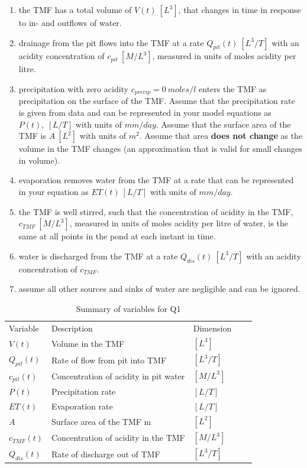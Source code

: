 \documentclass{article}
\begin{document}
\begin{enumerate}
\item  the TMF has a total volume of $V(t)~[L^3]$, that changes in time in response to in- and outflows of water.
\item drainage from the pit flows into the TMF at a rate $Q_{pit}(t)~[L^3/T]$ with an acidity concentration of $c_{pit}~[M/L^3]$, measured in units of moles acidity per litre.
\item precipitation with zero acidity $c_{precip} = 0~ moles/l$ enters the TMF as precipitation on the surface of the TMF. Assume that the precipitation rate is given from data and can be represented in your model equations as $P(t),~[L/T]$ with units of $mm/day$. Assume that the surface area of the TMF is $A~[L^2]$ with units of $m^2$. Assume that area \textbf{does not change} as the volume in the TMF changes (an approximation that is valid for small changes in volume). 
\item evaporation removes water from the TMF at a rate that can be represented in your equation as $ET(t)~[L/T]$ with units of $mm/day$. 
\item the TMF is well stirred, such that the concentration of acidity in the TMF, $c_{TMF}~[M/L^3]$, measured in units of moles acidity per litre of water, is the same at all points in the pond at each instant in time.
\item water is discharged from the TMF at a rate $Q_{dis}(t)~[L^3/T]$ with an acidity concentration of $c_{TMF}$.
\item assume all other sources and sinks of water are negligible and can be ignored.

\end{enumerate}
 

\begin{table}[H]
  \caption{Summary of variables for Q1}
  \begin{center}
\begin{tabular}{lllll}
Variable & Description    & Dimension  \\
$V(t)$ &  Volume in the TMF                               & $[L^3]$ \\
 $Q_{pit}(t)$    & Rate of flow from pit into TMF      & $[L^3/T]$\\
 $c_{pit}(t)$     & Concentration of acidity in pit water & $[M/L^3]$\\
 $P(t)$            & Precipitation rate                       & $[L/T]$ \\
$ET(t)$          & Evaporation rate                    & $[L/T]$  \\
$A$               & Surface area of the TMF m           &$[L^2]$  \\
 $c_{TMF}(t)$ & Concentration of acidity in the TMF & $[M/L^3]$ \\
 $Q_{dis}(t)$   & Rate of discharge out of TMF      & $[L^3/T]$ 

\end{tabular}
\end{center}
\end{table}
\end{document}
